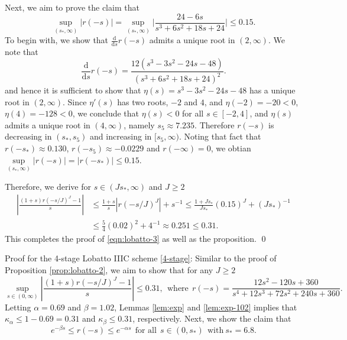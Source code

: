 \documentclass[a4paper, oneside]{book}
\def\d{{\mathrm{d}}}
\def\d{\mathrm{d}}
\begin{document}
Next, we aim to prove the claim that
\begin{equation}\label{claim:bound-3}
   \sup\limits_{(s_*, \infty)}
   \big|r(-s)\big| = \sup\limits_{(s_*, \infty)}
   \Big|\frac{24-6s}{s^3 + 6s^2 + 18s + 24}\Big|
   \le  0.15.
\end{equation}
To begin with, we show that $\frac{\d}{\d s}r(-s)$ admits a unique root in $(2, \infty)$. %
We note that
$$\frac{\d}{\d s}r(-s) = \frac{12(s^3-3s^2-24s-48)}
{(s^3 + 6s^2 + 18s + 24)^2}.$$
and hence it is sufficient to show that
$\eta(s) = s^3-3s^2-24s-48$
has a unique root in $(2, \infty)$.
Since $\eta'(s)$ has two roots, $-2$ and $4$,
and $\eta(-2)=-20<0$, $\eta(4)=-128<0$,
we conclude that $\eta(s) <0$ for all $s\in[-2,4]$, and
$\eta(s)$ admits a unique root in $(4, \infty)$,
namely $s_5 \approx 7.235$. %
Therefore $r(-s)$ is decreasing in $(s_*,s_5)$
and increasing in $[s_5,\infty)$.
Noting that fact that $r(-s_*) \approx 0.130$,
$r(-s_5)\approx -0.0229$ and $r(-\infty)=0$, we obtian
$
    \sup\limits_{(s_*, \infty)}
    \big|r(-s)\big| = \big|r(-s_*)\big|
    \le  0.15.
$

Therefore, we derive for $s\in (Js_*,\infty)$ and $J\ge 2$
\begin{equation*}
\begin{split}
    \left|\frac{(1+s) r(-s/J)^J-1}{s}\right|
    &\le \frac{1+s}{s}|r(-s/J)^J|+s^{-1}
    \le \frac{1+Js_*}{Js_*} (0.15)^J + (Js_*)^{-1}    \\
    &\le  \frac{5}{4} (0.02)^2 + 4^{-1}
    \approx 0.251 \le 0.31.
\end{split}
\end{equation*}
This completes the proof of \eqref{eqn:lobatto-3} as well as the proposition.
\qed

Proof for the 4-stage Lobatto IIIC scheme \eqref{4-stage}:
Similar to the proof of Proposition \ref{prop:lobatto-2}, we aim to show that for any $J\ge 2$
\begin{equation}\label{eqn:lobatto-4}
    \sup_{s\in(0,\infty)}  \left|\frac{(1+s) r(-s/J)^J-1}{s}\right| \le 0.31,
    ~~
    \text{where}~~ r(-s) =
    \frac{12s^2-120s+360}{s^4+12s^3+72s^2 + 240s + 360}.
\end{equation}
Letting $\alpha = 0.69$ and $\beta=1.02$,
Lemmas \ref{lem:exp} and \ref{lem:exp-102} implies that
$\kappa_\alpha \le 1-0.69 = 0.31$ and $\kappa_\beta \le 0.31$, respectively. Next, we show the claim that
\begin{equation}\label{claim:sand}
    e^{-\beta s} \le r(-s) \le e^{-\alpha s}~~ \text{for all}~~s\in(0,s_*)~~ \text{with}~s_*=6.8.
\end{equation}
\end{document}
